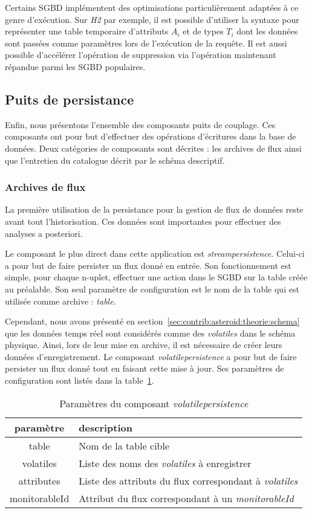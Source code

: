 Certains SGBD implémentent des optimisations particulièrement adaptées à ce genre d'exécution. Sur \textit{H2} par exemple, il est possible d'utiliser la syntaxe  pour représenter une table temporaire d'attributs $A_i$ et de types $T_i$ dont les données sont passées comme paramètres lors de l'exécution de la requête. Il est aussi possible d'accélérer l'opération de suppression via l'opération  maintenant répandue parmi les SGBD populaires.

\subsection{Puits de persistance}
Enfin, nous présentons l'ensemble des composants puits de couplage. Ces composants ont pour but d'effectuer des opérations d'écritures dans la base de données. Deux catégories de composants sont décrites : les archives de flux ainsi que l'entretien du catalogue décrit par le schéma descriptif.
\subsubsection{Archives de flux}
La première utilisation de la persistance pour la gestion de flux de données reste avant tout l'historisation. Ces données sont importantes pour effectuer des analyses a posteriori.

Le composant le plus direct dans cette application est \textit{streampersistence}. Celui-ci a pour but de faire persister un flux donné en entrée. Son fonctionnement est simple, pour chaque n-uplet, effectuer une action  dans le SGBD sur la table créée au préalable. Son seul paramètre de configuration est le nom de la table qui est utilisée comme archive : \textit{table}.

Cependant, nous avons présenté en section~\ref{sec:contrib:asteroid:theorie:schema} que les données temps réel sont considérés comme des \textit{volatiles} dans le schéma physique. Ainsi, lors de leur mise en archive, il est nécessaire de créer leurs données d'enregistrement. Le composant \textit{volatilepersistence} a pour but de faire persister un flux donné tout en faisant cette mise à jour. Ses paramètres de configuration sont listés dans la table~\ref{tab:contrib:asteroid:volatilepersistence}.

\begin{table}[ht]
    \centering
    \begin{tabular}{cl}
        paramètre & description \\ \midrule
        table & Nom de la table cible\\
        volatiles & Liste des noms des \textit{volatiles} à enregistrer\\
        attributes & Liste des attributs du flux correspondant à \textit{volatiles}\\
        monitorableId & Attribut du flux correspondant à un \textit{monitorableId}
    \end{tabular}
    \caption{Paramètres du composant \textit{volatilepersistence}}\label{tab:contrib:asteroid:volatilepersistence}
\end{table}

